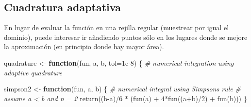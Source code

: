 \documentclass[
]{book}
\newenvironment{Shaded}{\begin{snugshade}}{\end{snugshade}}
\newcommand{\AttributeTok}[1]{\textcolor[rgb]{0.77,0.63,0.00}{#1}}
\newcommand{\CommentTok}[1]{\textcolor[rgb]{0.56,0.35,0.01}{\textit{#1}}}
\newcommand{\ControlFlowTok}[1]{\textcolor[rgb]{0.13,0.29,0.53}{\textbf{#1}}}
\newcommand{\DecValTok}[1]{\textcolor[rgb]{0.00,0.00,0.81}{#1}}
\newcommand{\FloatTok}[1]{\textcolor[rgb]{0.00,0.00,0.81}{#1}}
\newcommand{\FunctionTok}[1]{\textcolor[rgb]{0.00,0.00,0.00}{#1}}
\newcommand{\NormalTok}[1]{#1}
\newcommand{\OtherTok}[1]{\textcolor[rgb]{0.56,0.35,0.01}{#1}}
\newcommand{\SpecialCharTok}[1]{\textcolor[rgb]{0.00,0.00,0.00}{#1}}
\theoremstyle{break}
\theoremstyle{definition}
\theoremstyle{definition}
\theoremstyle{definition}
\theoremstyle{definition}
\theoremstyle{remark}
\begin{document}
\hypertarget{cuadratura-adaptativa}{%
\subsection{Cuadratura adaptativa}\label{cuadratura-adaptativa}}

En lugar de evaluar la función en una rejilla regular (muestrear por igual el dominio),
puede interesar ir añadiendo puntos sólo en los lugares donde se mejore la aproximación
(en principio donde hay mayor área).

\begin{Shaded}
\begin{Highlighting}[]
\NormalTok{quadrature }\OtherTok{\textless{}{-}} \ControlFlowTok{function}\NormalTok{(fun, a, b, }\AttributeTok{tol=}\FloatTok{1e{-}8}\NormalTok{) \{}
    \CommentTok{\# numerical integration using adaptive quadrature}

\NormalTok{  simpson2 }\OtherTok{\textless{}{-}} \ControlFlowTok{function}\NormalTok{(fun, a, b) \{}
    \CommentTok{\# numerical integral using Simpson\textquotesingle{}s rule}
    \CommentTok{\# assume a \textless{} b and n = 2}
    \FunctionTok{return}\NormalTok{((b}\SpecialCharTok{{-}}\NormalTok{a)}\SpecialCharTok{/}\DecValTok{6} \SpecialCharTok{*}\NormalTok{ (}\FunctionTok{fun}\NormalTok{(a) }\SpecialCharTok{+} \DecValTok{4}\SpecialCharTok{*}\FunctionTok{fun}\NormalTok{((a}\SpecialCharTok{+}\NormalTok{b)}\SpecialCharTok{/}\DecValTok{2}\NormalTok{) }\SpecialCharTok{+} \FunctionTok{fun}\NormalTok{(b)))}
\NormalTok{  \}}
 

\end{Highlighting}
\end{Shaded}
\end{document}
